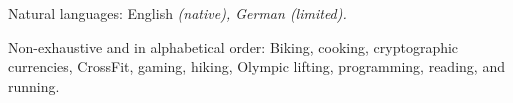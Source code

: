 \inlineheadsection
  {Natural languages:}
  {English \emph{(native), German \emph{(limited)}.}}


\spacedhrule{1.6em}{-0.4em}


\inlineheadsection
  {Non-exhaustive and in alphabetical order:}
  {Biking, cooking, cryptographic currencies, CrossFit, gaming, hiking, 
  Olympic lifting, programming, reading, and running.}



